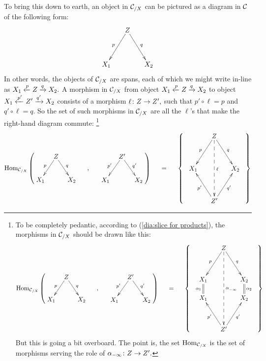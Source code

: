\documentclass[../main/CT4S-EN-RU]{subfiles}
\begin{document}
\begin{constructionENG}[Products]
To bring this down to earth, an object in $\mathcal{C}_{/X}$ can be pictured as a diagram in $\mathcal{C}$ of the following form:
$$\xymatrix@=15pt{&Z\ar[ldd]_p\ar[rdd]^q\\\\X_1&&X_2}$$   
In other words, the objects of $\mathcal{C}_{/X}$ are spans, each of which we might write in-line as $X_1\xleftarrow{p}Z\xrightarrow{q}X_2.$ A morphism in $\mathcal{C}_{/X}$ from object $X_1\xleftarrow{p}Z\xrightarrow{q}X_2$ to object $X_1\xleftarrow{p'}Z'\xrightarrow{q'}X_2$ consists of a morphism $\ell\colon Z\rightarrow Z',$ such that $p'\circ\ell=p$ and $q'\circ\ell=q.$ So the set of such morphisms in $\mathcal{C}_{/X}$ are all the $\ell$'s that make the right-hand diagram commute:
\footnote{To be completely pedantic, according to (\ref{dia:slice for products}), the morphisms in $\mathcal{C}_{/X}$ should be drawn like this:
\begin{align*}
\Hom_{\mcC_{/X}}\normalsize\left(\parbox{1in}{\xymatrix@=8pt{&Z\ar[ldd]_p\ar[rdd]^q\\\\X_1&&X_2}}\hspace{.2in},\hspace{.2in}\parbox{1in}{\xymatrix@=8pt{&Z'\ar[ldd]_{p'}\ar[rdd]^{q'}\\\\X_1&&X_2}}\right)\hspace{.2in}=\hspace{.2in}\left\{\;\;\parbox{1in}{\xymatrix@=15pt{&Z\ar[ldd]_{p}\ar[rdd]^{q}\ar@{-->}[ddddd]^{\alpha^{}_{-\infty}}\\\\X_1\ar@{=}[d]_{\alpha_1}&&X_2\ar@{=}[d]^{\alpha_2}\\X_1&&X_2\\\\&Z'\ar[uul]^{p'}\ar[uur]_{q'}}}\;\;\right\}
\end{align*}
But this is going a bit overboard. The point is, the set $\operatorname{Hom}_{\mathcal{C}_{/X}}$ is the set of morphisms serving the role of $\alpha_{-\infty}\colon Z\rightarrow Z'.$}
\begin{align}\label{dia:morphism of spans}
\Hom_{\mcC_{/X}}\normalsize\left(\parbox{1in}{\xymatrix@=8pt{&Z\ar[ldd]_p\ar[rdd]^q\\\\X_1&&X_2}}\hspace{.2in},\hspace{.2in}\parbox{1in}{\xymatrix@=8pt{&Z'\ar[ldd]_{p'}\ar[rdd]^{q'}\\\\X_1&&X_2}}\right)\hspace{.2in}=\hspace{.2in}\left\{\;\;\parbox{1in}{\xymatrix@=15pt{&Z\ar[ldd]_{p}\ar[rdd]^{q}\ar@{-->}[dddd]^\ell\\\\X_1&&X_2\\\\&Z'\ar[uul]^{p'}\ar[uur]_{q'}}}\;\;\right\}
\end{align}


\end{constructionENG}
\end{document}
